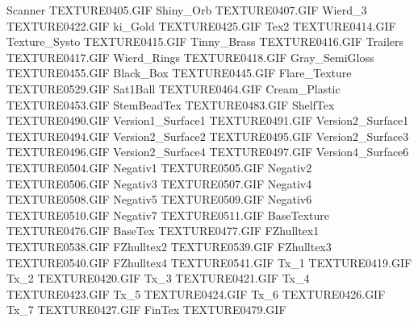 Scanner                        TEXTURE\TEX0405.GIF
Shiny_Orb                      TEXTURE\TEX0407.GIF
Wierd_3                        TEXTURE\TEX0422.GIF
ki_Gold                        TEXTURE\TEX0425.GIF
Tex2                           TEXTURE\TEX0414.GIF
Texture_Systo                  TEXTURE\TEX0415.GIF
Tinny_Brass                    TEXTURE\TEX0416.GIF
Trailers                       TEXTURE\TEX0417.GIF
Wierd_Rings                    TEXTURE\TEX0418.GIF
Gray_SemiGloss                 TEXTURE\TEX0455.GIF
Black_Box                      TEXTURE\TEX0445.GIF
Flare_Texture                  TEXTURE\TEX0529.GIF
Sat1Ball                       TEXTURE\TEX0464.GIF
Cream_Plastic                  TEXTURE\TEX0453.GIF
StemBeadTex                    TEXTURE\TEX0483.GIF
ShelfTex                       TEXTURE\TEX0490.GIF
Version1_Surface1              TEXTURE\TEX0491.GIF
Version2_Surface1              TEXTURE\TEX0494.GIF
Version2_Surface2              TEXTURE\TEX0495.GIF
Version2_Surface3              TEXTURE\TEX0496.GIF
Version2_Surface4              TEXTURE\TEX0497.GIF
Version4_Surface6              TEXTURE\TEX0504.GIF
Negativ1                       TEXTURE\TEX0505.GIF
Negativ2                       TEXTURE\TEX0506.GIF
Negativ3                       TEXTURE\TEX0507.GIF
Negativ4                       TEXTURE\TEX0508.GIF
Negativ5                       TEXTURE\TEX0509.GIF
Negativ6                       TEXTURE\TEX0510.GIF
Negativ7                       TEXTURE\TEX0511.GIF
BaseTexture                    TEXTURE\TEX0476.GIF
BaseTex                        TEXTURE\TEX0477.GIF
FZhulltex1                     TEXTURE\TEX0538.GIF
FZhulltex2                     TEXTURE\TEX0539.GIF
FZhulltex3                     TEXTURE\TEX0540.GIF
FZhulltex4                     TEXTURE\TEX0541.GIF
Tx_1                           TEXTURE\TEX0419.GIF
Tx_2                           TEXTURE\TEX0420.GIF
Tx_3                           TEXTURE\TEX0421.GIF
Tx_4                           TEXTURE\TEX0423.GIF
Tx_5                           TEXTURE\TEX0424.GIF
Tx_6                           TEXTURE\TEX0426.GIF
Tx_7                           TEXTURE\TEX0427.GIF
FinTex                         TEXTURE\TEX0479.GIF
